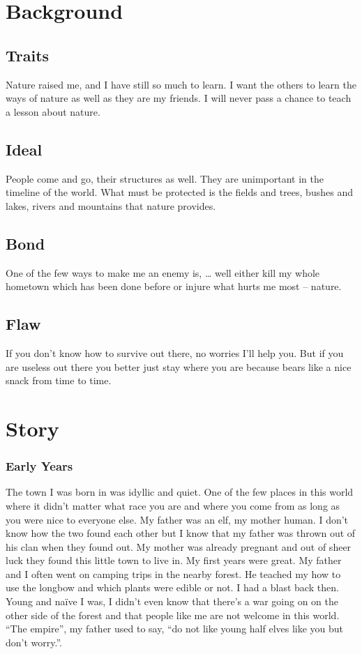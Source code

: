 \documentclass[letterpaper,10pt,twoside,twocolumn,openany]{book}
\begin{document}
	\vfill\null

	\section{Background}
		\subsection{Traits}
		Nature raised me, and I have still so much to learn. I want the others to learn the ways of nature as well as they are my friends. I will never pass a chance to teach a lesson about nature. 
		\subsection{Ideal}
		People come and go, their structures as well. They are unimportant in the timeline of the world. What must be protected is the fields and trees, bushes and lakes, rivers and mountains that nature provides. 
		\subsection{Bond}
		One of the few ways to make me an enemy is, … well either kill my whole hometown which has been done before or injure what hurts me most – nature. 
		\subsection{Flaw}
		If you don’t know how to survive out there, no worries I’ll help you. But if you are useless out there you better just stay where you are because bears like a nice snack from time to time. 

	\pagebreak
	
	\section{Story}
	\subsubsection{Early Years}
	The town I was born in was idyllic and quiet. One of the few places in this world where it didn’t matter what race you are and where you come from as long as you were nice to everyone else. My father was an elf, my mother human. I don’t know how the two found each other but I know that my father was thrown out of his clan when they found out. My mother was already pregnant and out of sheer luck they found this little town to live in. My first years were great. My father and I often went on camping trips in the nearby forest. He teached my how to use the longbow and which plants were edible or not. I had a blast back then. Young and naïve I was, I didn’t even know that there’s a war going on on the other side of the forest and that people like me are not welcome in this world. “The empire”, my father used to say, “do not like young half elves like you but don’t worry.”. 
	
\end{document}
